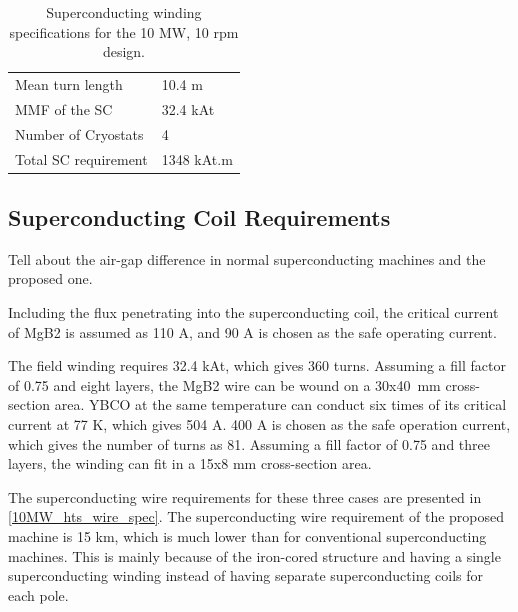 \documentclass[12pt]{iopart}
\begin{document}
\begin{table}[t]
  \centering
  \begin{tabular}{ll}
\hline
Mean turn length & 10.4 m \\
MMF of the SC & 32.4 kAt \\
Number of Cryostats & 4 \\
Total SC requirement & 1348 kAt.m \\
\hline
 \end{tabular}
  \caption{Superconducting winding specifications for the 10 MW, 10 rpm design.}
  \label{10MW_hts_spec}
\end{table}


\subsection{Superconducting Coil Requirements}

Tell about the air-gap difference in normal superconducting machines and the proposed one.

Including the flux penetrating into the superconducting coil, the critical current of MgB2 is assumed as 110 A, and 90 A is chosen as the safe operating current.

The field winding requires 32.4 kAt, which gives 360 turns. Assuming a fill factor of 0.75 and eight layers, the MgB2 wire can be wound on a 30x40~mm cross-section area. YBCO at the same temperature can conduct six times of its critical current at 77 K, which gives 504 A. 400 A is chosen as the safe operation current, which gives the number of turns as 81. Assuming a fill factor of 0.75 and three layers, the winding can fit in a 15x8 mm cross-section area.


The superconducting wire requirements for these three cases are presented in \ref{10MW_hts_wire_spec}. The superconducting wire requirement of the proposed machine is 15 km, which is much lower than for conventional superconducting machines. This is mainly because of the iron-cored structure and having a single superconducting winding instead of having separate superconducting coils for each pole.
\end{document}
